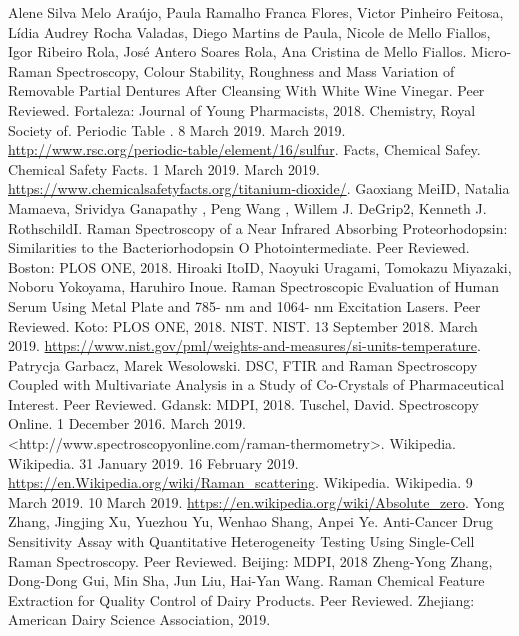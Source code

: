 \documentclass[twocolumn]{article}
\begin{document}
\begin{thebibliography}{12}
Alene Silva Melo Ara\'ujo, Paula Ramalho Franca Flores, Victor Pinheiro Feitosa, L\'idia Audrey Rocha Valadas, Diego Martins de Paula, Nicole de Mello Fiallos, Igor Ribeiro Rola, Jos\'e Antero Soares Rola, Ana Cristina de Mello Fiallos. Micro-Raman Spectroscopy, Colour Stability, Roughness and Mass Variation of Removable Partial Dentures After Cleansing With White Wine Vinegar. Peer Reviewed. Fortaleza: Journal of Young Pharmacists, 2018.
Chemistry, Royal Society of. Periodic Table . 8 March 2019. March 2019. \url{http://www.rsc.org/periodic-table/element/16/sulfur}.
Facts, Chemical Safey. Chemical Safety Facts. 1 March 2019. March 2019. \url{https://www.chemicalsafetyfacts.org/titanium-dioxide/}.
Gaoxiang MeiID, Natalia Mamaeva, Srividya Ganapathy , Peng Wang , Willem J. DeGrip2, Kenneth J. RothschildI. Raman Spectroscopy of a Near Infrared Absorbing Proteorhodopsin: Similarities to the Bacteriorhodopsin O Photointermediate. Peer Reviewed. Boston: PLOS ONE, 2018.
Hiroaki ItoID, Naoyuki Uragami, Tomokazu Miyazaki, Noboru Yokoyama, Haruhiro Inoue. Raman Spectroscopic Evaluation of Human Serum Using Metal Plate and 785- nm and 1064- nm Excitation Lasers. Peer Reviewed. Koto: PLOS ONE, 2018.
NIST. NIST. 13 September 2018. March 2019. \url{https://www.nist.gov/pml/weights-and-measures/si-units-temperature}.
Patrycja Garbacz, Marek Wesolowski. DSC, FTIR and Raman Spectroscopy Coupled with Multivariate Analysis in a Study of Co-Crystals of Pharmaceutical Interest. Peer Reviewed. Gdansk: MDPI, 2018.
Tuschel, David. Spectroscopy Online. 1 December 2016. March 2019. <http://www.spectroscopyonline.com/raman-thermometry>.
Wikipedia. Wikipedia. 31 January 2019. 16 February 2019. \url{https://en.Wikipedia.org/wiki/Raman_scattering}.
Wikipedia. Wikipedia. 9 March 2019. 10 March 2019. \url{https://en.wikipedia.org/wiki/Absolute_zero}.
Yong Zhang, Jingjing Xu, Yuezhou Yu, Wenhao Shang, Anpei Ye. Anti-Cancer Drug Sensitivity Assay with Quantitative Heterogeneity Testing Using Single-Cell Raman Spectroscopy. Peer Reviewed. Beijing: MDPI, 2018
Zheng-Yong Zhang, Dong-Dong Gui, Min Sha, Jun Liu, Hai-Yan Wang. Raman Chemical Feature Extraction for Quality Control of Dairy Products. Peer Reviewed. Zhejiang: American Dairy Science Association, 2019.
\end{thebibliography}
\end{document}
